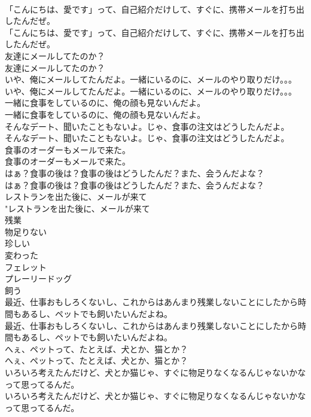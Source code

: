 \documentclass[8pt]{extreport}
\begin{document}
\begin{CJK}{UTF8}{min}
\\	「こんにちは、愛です」って、自己紹介だけして、すぐに、携帯メールを打ち出したんだぜ。	
\\	「こんにちは、愛です」って、自己紹介だけして、すぐに、携帯メールを打ち出したんだぜ。 
\\	友達にメールしてたのか？	
\\	友達にメールしてたのか？ 
\\	いや、俺にメールしてたんだよ。一緒にいるのに、メールのやり取りだけ。。。	
\\	いや、俺にメールしてたんだよ。一緒にいるのに、メールのやり取りだけ。。。 
\\	一緒に食事をしているのに、俺の顔も見ないんだよ。	
\\	一緒に食事をしているのに、俺の顔も見ないんだよ。 
\\	そんなデート、聞いたこともないよ。じゃ、食事の注文はどうしたんだよ。	
\\	そんなデート、聞いたこともないよ。じゃ、食事の注文はどうしたんだよ。 
\\	食事のオーダーもメールで来た。	
\\	食事のオーダーもメールで来た。 
\\	はぁ？食事の後は？食事の後はどうしたんだ？また、会うんだよな？	
\\	はぁ？食事の後は？食事の後はどうしたんだ？また、会うんだよな？ 
\\	レストランを出た後に、メールが来て	
\\	"レストランを出た後に、メールが来て 
\\	残業
\\	物足りない
\\	珍しい
\\	変わった
\\	フェレット
\\	プレーリードッグ
\\	飼う
\\	最近、仕事おもしろくないし、これからはあんまり残業しないことにしたから時間もあるし、ペットでも飼いたいんだよね。	
\\	最近、仕事おもしろくないし、これからはあんまり残業しないことにしたから時間もあるし、ペットでも飼いたいんだよね。 
\\	へぇ、ペットって、たとえば、犬とか、猫とか？	
\\	へぇ、ペットって、たとえば、犬とか、猫とか？ 
\\	いろいろ考えたんだけど、犬とか猫じゃ、すぐに物足りなくなるんじゃないかなって思ってるんだ。	
\\	いろいろ考えたんだけど、犬とか猫じゃ、すぐに物足りなくなるんじゃないかなって思ってるんだ。 

\end{CJK}
\end{document}
